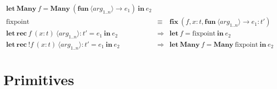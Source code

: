 \begin{center}
\[\begin{array}{rcl}
    \mathbf{let\ Many}\ f = \mathbf{Many}\ (\mathbf{fun}\ {\langle arg_{1 .. n} \rangle}
    \rightarrow e_1)\ \mathbf{in}\ e_2
\\
    \mathrm{fixpoint} & \equiv & \mathbf{fix}\ (f, x : t, \mathbf{fun}
    \ {\langle arg_{1 .. n} \rangle} \rightarrow e_1 : {t'} )
\\
    \mathbf{let\ rec}\ f\ (x : t)\ {\langle arg_{1 .. n} \rangle} : {t'} = e_1\ \mathbf{in}\ e_2 &
    \Rightarrow &
    \mathbf{let}\ f = \mathrm{fixpoint}\ \mathbf{in}\ e_2
\\
    \mathbf{let\ rec}\ !f\ (x : t)\ {\langle arg_{1 .. n} \rangle} : {t'} = e_1\ \mathbf{in}\ e_2 &
    \Rightarrow &
    \mathbf{let\ Many}\ f = \mathbf{Many}\ \mathrm{fixpoint}\ \mathbf{in}\ e_2
    \end{array}
\]
\end{center}

\clearpage
\section{Primitives}\label{subsec:primitives}

